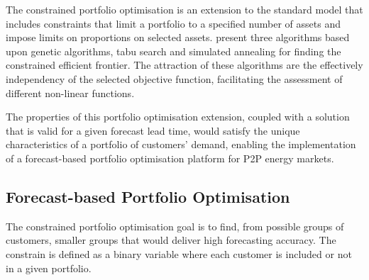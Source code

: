 \documentclass[preprint,3p,12pt,authoryear]{elsarticle}
\begin{document}
The constrained portfolio optimisation is an extension to the standard model that includes constraints that limit a portfolio to a specified number of assets and impose limits on proportions on selected assets.
\citet{CHANG20001271} present three algorithms based upon genetic algorithms, tabu search and simulated annealing for finding the constrained efficient frontier.
The attraction of these algorithms are the effectively independency of the selected objective function, facilitating the assessment of different non-linear functions.

The properties of this portfolio optimisation extension, coupled with a solution that is valid for a given forecast lead time, would satisfy the unique characteristics of a portfolio of customers' demand, enabling the implementation of a forecast-based portfolio optimisation platform for P2P energy markets.

\subsection{Forecast-based Portfolio Optimisation}
\label{ss:portopt}

The constrained portfolio optimisation goal is to find, from possible groups of customers, smaller groups that would deliver high forecasting accuracy.
The constrain is defined as a binary variable where each customer is included or not in a given portfolio.
\end{document}
